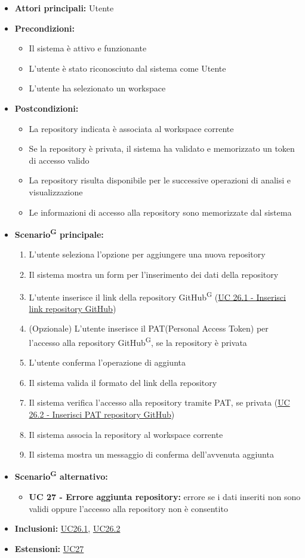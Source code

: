 \documentclass[a4paper, 11pt]{article}
\begin{document}
\begin{itemize}
	\item \textbf{Attori principali:} Utente
	\item \textbf{Precondizioni:}
	\begin{itemize}
		\item Il sistema è attivo e funzionante
		\item L'utente è stato riconosciuto dal sistema come Utente
		\item L'utente ha selezionato un workspace
	\end{itemize}
	\item \textbf{Postcondizioni:}
	\begin{itemize}
		\item La repository indicata è associata al workspace corrente
		\item Se la repository è privata, il sistema ha validato e memorizzato un token di accesso valido
		\item La repository risulta disponibile per le successive operazioni di analisi e visualizzazione
		\item Le informazioni di accesso alla repository sono memorizzate dal sistema
	\end{itemize}
	\item \textbf{Scenario\textsuperscript{G} principale:}
	\begin{enumerate}
		\item L'utente seleziona l'opzione per aggiungere una nuova repository
		\item Il sistema mostra un form per l'inserimento dei dati della repository
		\item L'utente inserisce il link della repository GitHub\textsuperscript{G} (\hyperref[UC26.1]{UC 26.1 - Inserisci link repository GitHub})
		\item (Opzionale) L'utente inserisce il PAT(Personal Access Token) per l'accesso alla repository GitHub\textsuperscript{G}, se la repository è privata
		\item L'utente conferma l'operazione di aggiunta
		\item Il sistema valida il formato del link della repository
		\item Il sistema verifica l'accesso alla repository tramite PAT, se privata (\hyperref[UC26.2]{UC 26.2 - Inserisci PAT repository GitHub})
		\item Il sistema associa la repository al workspace corrente
		\item Il sistema mostra un messaggio di conferma dell'avvenuta aggiunta
	\end{enumerate}
	\item \textbf{Scenario\textsuperscript{G} alternativo:}
	\begin{itemize}
		\item \textbf{UC 27 - Errore aggiunta repository:} errore se i dati inseriti non sono validi oppure l'accesso alla repository non è consentito
	\end{itemize}
	\item \textbf{Inclusioni:} \hyperref[UC26.1]{UC26.1}, \hyperref[UC26.2]{UC26.2}
	\item \textbf{Estensioni:} \hyperref[UC27]{UC27}
\end{itemize}
\end{document}
